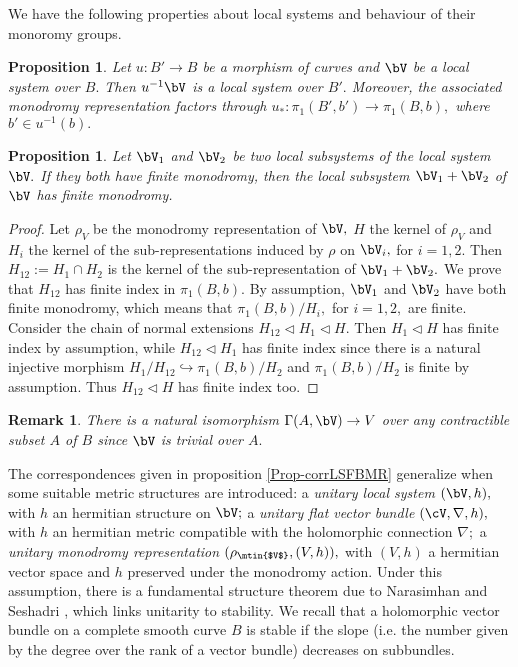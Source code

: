 \documentclass[a4paper,11pt]{amsart}
\newtheorem{proposition}[theorem]{Proposition}
\newtheorem{remark}[theorem]{Remark}
\begin{document}
{	We have the following properties about local systems and behaviour of their monoromy groups.
	\begin{proposition}\label{Prop-LocSysBC} Let $u : B'\to B$ be a morphism of curves and $\bV$ be a local system over $B.$ Then $u^{-1}\bV$ is a local system over $B'.$ Moreover, the associated monodromy representation factors through $u_\ast:\pi_1(B',b')\to \pi_1(B,b),$ where $b'\in u^{-1}(b).$ 
		\end{proposition}
		\begin{proposition}\label{Prop-SumLocSys} Let $\bV_1$ and $\bV_2$ be two local subsystems of the local system $\bV.$ If they  both have finite monodromy, then the local subsystem $\bV_1+ \bV_2$ of $\bV$ has finite monodromy.
		\end{proposition}
		\begin{proof} Let $\rho_{V}$ be the monodromy representation of $\bV,$ $H$ the kernel of $\rho_{V}$ and $H_i$ the kernel of the sub-representations induced by $\rho$ on $\bV_i,$ for $i=1,2.$  Then $H_{12}:=H_1\cap H_2$ is the kernel of the sub-representation of $\bV_1+ \bV_2.$ We prove that $H_{12}$ has finite index in $\pi_1(B,b).$ By assumption, $\bV_1$ and $\bV_2$ have both finite monodromy, which means that $\pi_1(B,b)/H_i,$ for $i=1,2,$ are finite. Consider the chain of normal extensions $H_{12}\triangleleft H_1 \triangleleft  H.$ Then $H_1\triangleleft  H$ has finite index by assumption, while $H_{12}\triangleleft H_1$ has finite index since there is a natural injective morphism $H_1/H_{12}\hookrightarrow \pi_1(B,b)/H_2$ and $\pi_1(B,b)/H_2$ is finite by assumption.  Thus $H_{12}\vartriangleleft H$ has finite index too.
		\end{proof}
		
		\begin{remark} \label{garibaldi}
			There is a natural isomorphism $\Gamma(A,\bV)\to V$ over any contractible subset $A$ of $B$ since $\bV$ is trivial over $A.$
		\end{remark}
			
			The correspondences given in proposition \ref{Prop-corrLSFBMR} generalize when some suitable metric structures  are introduced: a {\em  unitary local system} $(\bV, h),$ with $h$ an hermitian structure on $\bV;$ a {\em unitary flat vector bundle} $(\cV,\nabla, h),$ with $h$ an hermitian metric compatible with the holomorphic connection $\nabla;$ a {\em unitary monodromy representation} $(\rho_{\mtin{$V$}},(V,h)),$ with $(V,h)$ a hermitian vector space and $h$ preserved under the monodromy action. Under this assumption, there is a fundamental structure theorem  due to Narasimhan and Seshadri \cite{NarSes_Stable_1965}, which links unitarity to stability. We recall that a holomorphic vector bundle on a complete smooth curve $B$ is stable if the slope (i.e. the number given by the degree over the rank of a vector bundle) decreases on subbundles.
			
}
\end{document}
